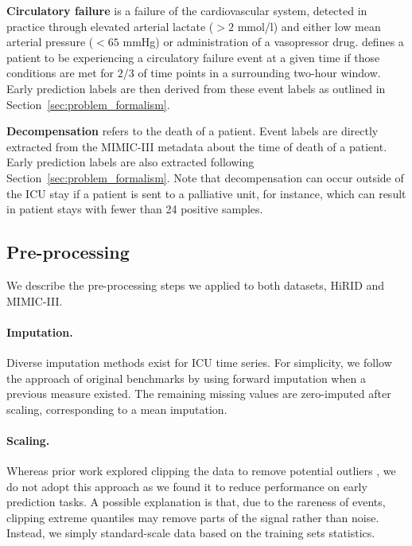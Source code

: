 \documentclass[nohyperref]{article}
\begin{document}
\textbf{Circulatory failure} is a failure of the cardiovascular system, detected in practice through elevated arterial lactate ($> 2$ mmol/l) and either low mean arterial pressure ($< 65$ mmHg) or administration of a vasopressor drug. \citet{yeche2021} defines a patient to be experiencing a circulatory failure event at a given time if those conditions are met for $2/3$ of time points in a surrounding two-hour window. Early prediction labels are then derived from these event labels as outlined in Section~\ref{sec:problem_formalism}.

\textbf{Decompensation} refers to the death of a patient. Event labels are directly extracted from the MIMIC-III \citep{johnson2016} metadata about the time of death of a patient. Early prediction labels are also extracted following Section~\ref{sec:problem_formalism}. Note that decompensation can occur outside of the ICU stay if a patient is sent to a palliative unit, for instance, which can result in patient stays with fewer than 24 positive samples.



\subsection{Pre-processing}

We describe the pre-processing steps we applied to both datasets, HiRID and MIMIC-III.

\paragraph{Imputation.}
Diverse imputation methods exist for ICU time series. For simplicity, we follow the approach of original benchmarks \citep{harutyunyan2019multitask,yeche2021} by using forward imputation when a previous measure existed. The remaining missing values are zero-imputed after scaling, corresponding to a mean imputation. 

\paragraph{Scaling.} Whereas prior work explored clipping the data to remove potential outliers \citep{tomavsev2019}, we do not adopt this approach as we found it to reduce performance on early prediction tasks. A possible explanation is that, due to the rareness of events, clipping extreme quantiles may remove parts of the signal rather than noise. Instead, we simply standard-scale data based on the training sets statistics. 
\end{document}
